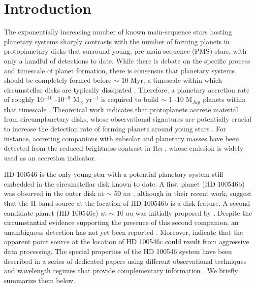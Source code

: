 \documentclass{aa}
\begin{document}
\section{Introduction}
\label{Sect:Intro}
The exponentially increasing number of known main-sequence stars hosting planetary systems sharply contrasts with the number of forming planets in protoplanetary disks that surround young, pre-main-sequence (PMS) stars, with only a handful of detections to date. While there is debate on the specific process and timescale of planet formation, there is consensus that planetary systems should be completely formed before $\sim$ 10 Myr, a timescale within which circumstellar disks are typically dissipated \citep{Haisch01}. Therefore, a planetary accretion rate of roughly 10$^{-10}$ -10$^{-9}$ M$_{\odot}$ yr$^{-1}$ is required to build $\sim$ 1 -10 M$_{Jup}$ planets within that timescale \citep[see, e.g.,][]{Lovelace11,Sallum15}. Theoretical work indicates that protoplanets accrete material from circumplanetary disks, whose observational signatures are potentially crucial to increase the detection rate of forming planets around young stars \citep[see, e.g.,][]{Zhu15}. For instance, accreting companions with subsolar and planetary masses have been detected from the reduced brightness contrast in H$\alpha$ \citep{Bowler14,Close14,Zhou14,Sallum15}, whose emission is widely used as an accretion indicator.

HD 100546 \citep[d = 109 $\pm$ 4 pc from the first Gaia Data Release;][]{
Lindegren16} is the only young star with a potential planetary system still embedded in the circumstellar disk known to date. A first planet (HD 100546b) was observed in the outer disk at $\sim$ 50 $au$ \citep{Quanz13,Quanz15,Currie14}, although in their recent work, \citet{Rameau17} suggest that the H-band source at the location of HD 100546b is a disk feature. A second candidate planet (HD 100546c) at $\sim$ 10 $au$ was initially proposed by \citet{Bouwman03}. Despite the circumstantial evidence supporting the presence of this second companion, an unambiguous detection has not yet been reported \citep[see, e.g.,][]{Acke06,Brittain09,Brittain13,Brittain14,Boccaletti13,Walsh14,Currie15}. Moreover, \citet{Follette17} indicate that the apparent point source at the location of HD 100546c could result from aggressive data processing. The special properties of the HD 100546 system have been described in a series of dedicated papers using different observational techniques and wavelength regimes that provide complementary information \citep{Sicilia-Aguilar16}. We briefly
summarize them below.
 
\end{document}

